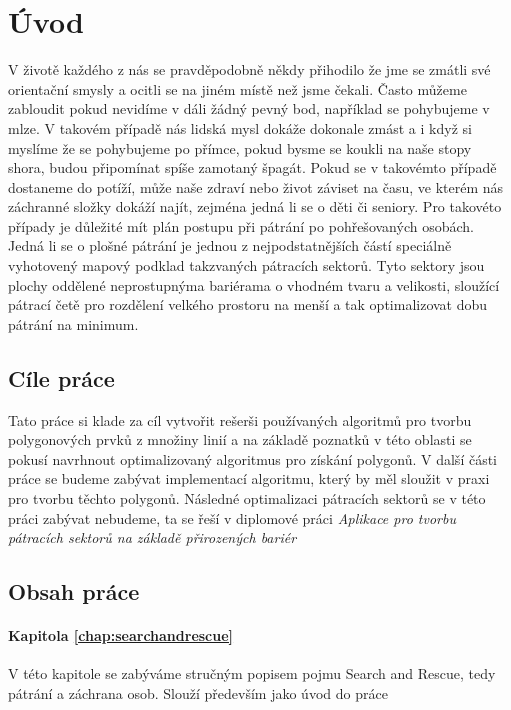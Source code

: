 \chapter{Úvod}
	V životě každého z nás se pravděpodobně někdy přihodilo že jme se zmátli své orientační smysly a ocitli se na jiném místě než jsme čekali. Často můžeme zabloudit pokud nevidíme v dáli žádný pevný bod, například se pohybujeme v mlze. V takovém případě nás lidská mysl dokáže dokonale zmást a i když si myslíme že se pohybujeme po přímce, pokud bysme se koukli na naše stopy shora, budou připomínat spíše zamotaný špagát. Pokud se v takovémto případě dostaneme do potíží, může naše zdraví nebo život záviset na času, ve kterém nás záchranné složky dokáží najít, zejména jedná li se o děti či seniory.
	Pro takovéto případy je důležité mít plán postupu při pátrání po pohřešovaných osobách. Jedná li se o plošné pátrání je jednou z nejpodstatnějších částí speciálně vyhotovený mapový podklad takzvaných pátracích sektorů. Tyto sektory jsou plochy oddělené neprostupnýma bariérama o vhodném tvaru a velikosti, sloužící pátrací četě pro rozdělení velkého prostoru na menší a tak optimalizovat dobu pátrání na minimum.
		
\section{Cíle práce}
	Tato práce si klade za cíl vytvořit rešerši používaných algoritmů pro tvorbu polygonových prvků z množiny linií a na základě poznatků v této oblasti se pokusí navrhnout optimalizovaný algoritmus pro získání polygonů. V další části práce se budeme zabývat implementací algoritmu, který by měl sloužit v praxi pro tvorbu těchto polygonů. Následné optimalizaci pátracích sektorů se v této práci zabývat nebudeme, ta se řeší v diplomové práci \textit{Aplikace pro tvorbu pátracích sektorů na základě přirozených bariér} \cite{sladkova2019aplikace}
	
\section{Obsah práce}

\subsubsection{Kapitola \ref{chap:searchandrescue}}
	V této kapitole se zabýváme stručným popisem pojmu Search and Rescue, tedy pátrání a záchrana osob. Slouží především jako úvod do práce

